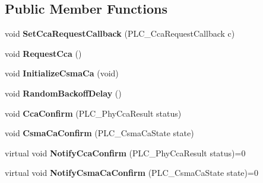 \subsection*{\-Public \-Member \-Functions}
\begin{DoxyCompactItemize}
\item 
\hypertarget{classns3_1_1PLC__Mac_a9ccda352e399dcd918706fe4ee66a0bb}{void {\bfseries \-Set\-Cca\-Request\-Callback} (\-P\-L\-C\-\_\-\-Cca\-Request\-Callback c)}\label{classns3_1_1PLC__Mac_a9ccda352e399dcd918706fe4ee66a0bb}

\item 
\hypertarget{classns3_1_1PLC__Mac_a19c6fdcec31cc260d7a693bc88835df3}{void {\bfseries \-Request\-Cca} ()}\label{classns3_1_1PLC__Mac_a19c6fdcec31cc260d7a693bc88835df3}

\item 
\hypertarget{classns3_1_1PLC__Mac_afce2b58d5e04d132bbc8b23122a36b9c}{void {\bfseries \-Initialize\-Csma\-Ca} (void)}\label{classns3_1_1PLC__Mac_afce2b58d5e04d132bbc8b23122a36b9c}

\item 
\hypertarget{classns3_1_1PLC__Mac_a7c71e368a637aeea37257b87202159aa}{void {\bfseries \-Random\-Backoff\-Delay} ()}\label{classns3_1_1PLC__Mac_a7c71e368a637aeea37257b87202159aa}

\item 
\hypertarget{classns3_1_1PLC__Mac_a11c528f88433d9a1e3282e81033cf647}{void {\bfseries \-Cca\-Confirm} (\-P\-L\-C\-\_\-\-Phy\-Cca\-Result status)}\label{classns3_1_1PLC__Mac_a11c528f88433d9a1e3282e81033cf647}

\item 
\hypertarget{classns3_1_1PLC__Mac_aff4ca9f070971b39b63497cf27d9793f}{void {\bfseries \-Csma\-Ca\-Confirm} (\-P\-L\-C\-\_\-\-Csma\-Ca\-State state)}\label{classns3_1_1PLC__Mac_aff4ca9f070971b39b63497cf27d9793f}

\item 
\hypertarget{classns3_1_1PLC__Mac_a0a720ec80af731b095c8cfaa87184b49}{virtual void {\bfseries \-Notify\-Cca\-Confirm} (\-P\-L\-C\-\_\-\-Phy\-Cca\-Result status)=0}\label{classns3_1_1PLC__Mac_a0a720ec80af731b095c8cfaa87184b49}

\item 
\hypertarget{classns3_1_1PLC__Mac_a5862b8e436431044f8afbe755a94990e}{virtual void {\bfseries \-Notify\-Csma\-Ca\-Confirm} (\-P\-L\-C\-\_\-\-Csma\-Ca\-State state)=0}\label{classns3_1_1PLC__Mac_a5862b8e436431044f8afbe755a94990e}


\end{DoxyCompactItemize}
